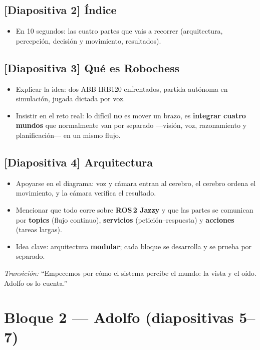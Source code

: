 \documentclass[11pt]{article}
\newcommand{\slide}[1]{\textbf{\color{azul}[Diapositiva #1]}}
\newcommand{\transicion}[1]{\par\smallskip\noindent\textit{\color{gris}Transición:} #1}
\begin{document}
\subsection{\slide{2} Índice}
\begin{itemize}
    \item En 10 segundos: las cuatro partes que vais a recorrer
          (arquitectura, percepción, decisión y movimiento, resultados).
\end{itemize}

\subsection{\slide{3} Qué es Robochess}
\begin{itemize}
    \item Explicar la idea: dos ABB IRB120 enfrentados, partida autónoma en
          simulación, jugada dictada por voz.
    \item Insistir en el reto real: lo difícil \textbf{no} es mover un brazo,
          es \textbf{integrar cuatro mundos} que normalmente van por separado
          ---visión, voz, razonamiento y planificación--- en un mismo flujo.
\end{itemize}

\subsection{\slide{4} Arquitectura}
\begin{itemize}
    \item Apoyarse en el diagrama: voz y cámara entran al cerebro, el cerebro
          ordena el movimiento, y la cámara verifica el resultado.
    \item Mencionar que todo corre sobre \textbf{ROS\,2 Jazzy} y que las partes
          se comunican por \textbf{topics} (flujo continuo), \textbf{servicios}
          (petición--respuesta) y \textbf{acciones} (tareas largas).
    \item Idea clave: arquitectura \textbf{modular}; cada bloque se desarrolla y
          se prueba por separado.
\end{itemize}

\transicion{``Empecemos por cómo el sistema percibe el mundo: la vista y el
oído. Adolfo os lo cuenta.''}

\bigskip
\section{Bloque 2 --- Adolfo (diapositivas 5--7)}
\end{document}
